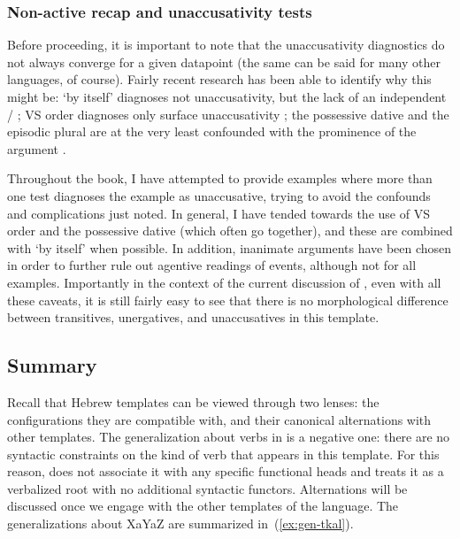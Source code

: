 \begin{exe}
\begin{xlist}
\begin{exe}
\begin{xlist}
\begin{exe}
\begin{xlist}
\begin{exe}
\begin{exe}
\begin{xlist}
\begin{exe}
\begin{xlist}
\begin{exe}
\begin{xlist}
\begin{exe}
\begin{xlist}
\begin{exe}
\begin{xlist}
\begin{exe}
\begin{xlist}
\begin{exe}
\begin{xlist}
\begin{exe}
\begin{xlist}
\begin{xlist}
\begin{exe}
\begin{xlist}
\begin{exe}
\begin{xlist}
		\subsubsection{Non-active recap and unaccusativity tests}
Before proceeding, it is important to note that the unaccusativity diagnostics do not always converge for a given datapoint (the same can be said for many other languages, of course). Fairly recent research has been able to identify why this might be: `by itself' diagnoses not unaccusativity, but the lack of an independent / \citep{layering15}; VS order diagnoses only surface unaccusativity \citep{kastner17gjgl}; the possessive dative and the episodic plural are at the very least confounded with the prominence of the argument \citep{gafter14li,linzen14pd}.

Throughout the book, I have attempted to provide examples where more than one test diagnoses the example as unaccusative, trying to avoid the confounds and complications just noted. In general, I have tended towards the use of VS order and the possessive dative (which often go together), and these are combined with `by itself' when possible. In addition, inanimate arguments have been chosen in order to further rule out agentive readings of events, although not for all examples. Importantly in the context of the current discussion of {\tkal}, even with all these caveats, it is still fairly easy to see that there is no morphological difference between transitives, unergatives,  and unaccusatives in this template.


	\subsection{Summary}

Recall that Hebrew templates can be viewed through two lenses: the configurations they are compatible with, and their canonical alternations with other templates. The generalization about verbs in {\tkal} is a negative one: there are no syntactic constraints on the kind of verb that appears in this template. For this reason, \cite{doron03} does not associate it with any specific functional heads and \cite{borer13oup,borer15roots} treats it as a verbalized root with no additional syntactic functors. Alternations will be discussed once we engage with the other templates of the language. The generalizations about XaYaZ are summarized in~(\ref{ex:gen-tkal}).


\end{xlist}
\end{exe}
\end{xlist}
\end{exe}
\end{xlist}
\end{xlist}
\end{exe}
\end{xlist}
\end{exe}
\end{xlist}
\end{exe}
\end{xlist}
\end{exe}
\end{xlist}
\end{exe}
\end{xlist}
\end{exe}
\end{xlist}
\end{exe}
\end{xlist}
\end{exe}
\end{exe}
\end{xlist}
\end{exe}
\end{xlist}
\end{exe}
\end{xlist}
\end{exe}
